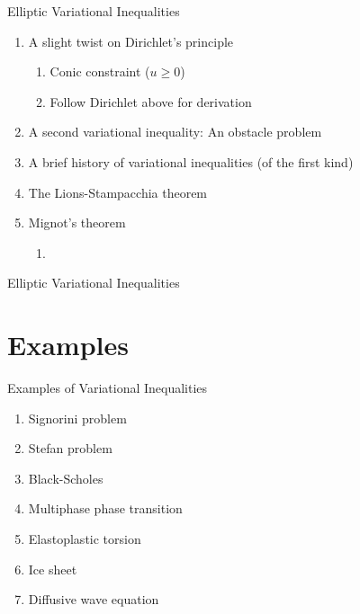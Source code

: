 \documentclass[aspectratio=169,xcolor=dvipsnames,11pt]{beamer}
\begin{document}
\begin{frame}{Elliptic Variational Inequalities}
        \begin{enumerate}
        \item A slight twist on Dirichlet's principle
            \begin{enumerate}
                \item Conic constraint ($u \ge 0$)
                \item Follow Dirichlet above for derivation
            \end{enumerate}
        \item A second variational inequality: An obstacle problem
        \item A brief history of variational inequalities (of the first kind)
        \item The Lions-Stampacchia theorem
        \item Mignot's theorem
            \begin{enumerate}
                \item 
            \end{enumerate}
    \end{enumerate}
\end{frame}

\begin{frame}{Elliptic Variational Inequalities}
\end{frame}

\section{Examples}\label{sec:examples}
\begin{frame}{Examples of Variational Inequalities}
    \begin{enumerate}
        \item Signorini problem
        \item Stefan problem
        \item Black-Scholes
        \item Multiphase phase transition
        \item Elastoplastic torsion
        \item Ice sheet
        \item Diffusive wave equation
    \end{enumerate}
\end{frame}
\end{document}
